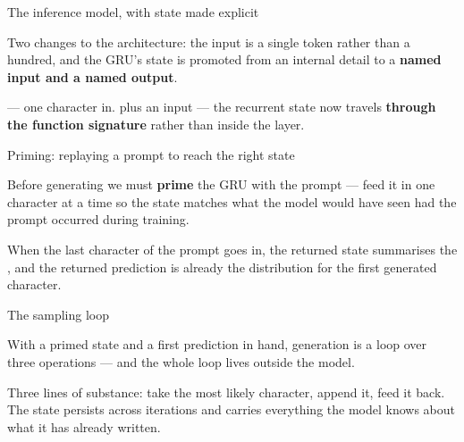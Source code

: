 \documentclass[aspectratio=169,11pt,t]{beamer}
\begin{document}
\begin{frame}[shrink=25]{The inference model, with state made explicit}
{\fontsize{9.4}{12.6}\selectfont\color{fg2}Two changes to the architecture: the input is a single token rather than a hundred, and the GRU's state is promoted from an internal detail to a \textbf{named input and a named output}.\par}\vskip 4pt
{\fontsize{9.4}{12.6}\selectfont\color{fg2} --- one character in.  plus an  input --- the recurrent state now travels \textbf{through the function signature} rather than inside the layer.\par}\vskip 4pt
\end{frame}

\begin{frame}[shrink=25]{Priming: replaying a prompt to reach the right state}
{\fontsize{9.4}{12.6}\selectfont\color{fg2}Before generating we must \textbf{prime} the GRU with the prompt --- feed it in one character at a time so the state matches what the model would have seen had the prompt occurred during training.\par}\vskip 4pt
{\fontsize{9.4}{12.6}\selectfont\color{fg2}When the last character of the prompt goes in, the returned state summarises the , and the returned prediction is already the distribution for the first generated character.\par}\vskip 4pt
\end{frame}

\begin{frame}[shrink=25]{The sampling loop}
{\fontsize{9.4}{12.6}\selectfont\color{fg2}With a primed state and a first prediction in hand, generation is a loop over three operations --- and the whole loop lives outside the model.\par}\vskip 4pt
{\fontsize{9.4}{12.6}\selectfont\color{fg2}Three lines of substance: take the most likely character, append it, feed it back. The state persists across iterations and carries everything the model knows about what it has already written.\par}\vskip 4pt
\end{frame}
\end{document}
